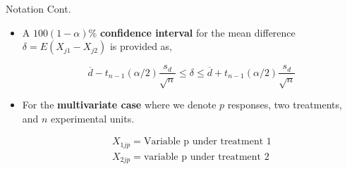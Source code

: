 \documentclass[8pt]{beamer}
\begin{document}
    \begin{frame}{Notation Cont.}
    
        \begin{itemize}
            \item A $100(1 - \alpha)\%$ \textbf{confidence interval} for the mean difference $\delta = E(X_{j1} - X_{j2})$ is provided as, 
            
            \begin{equation}
                \overline{d} - t_{n-1}(\alpha/2)\frac{s_{d}}{\sqrt{n}} \leq \delta \leq \overline{d} + t_{n-1}(\alpha/2)\frac{s_{d}}{\sqrt{n}}
            \end{equation}
            
            \item For the \textbf{multivariate case} where we denote $p$ responses, two treatments, and $n$ experimental units. 
            
            \begin{align*}
                X_{1jp} = \text{Variable p under treatment 1} \\
                X_{2jp} = \text{variable p under treatment 2}
            \end{align*}
            
        \end{itemize}
    \end{frame}
\end{document}
